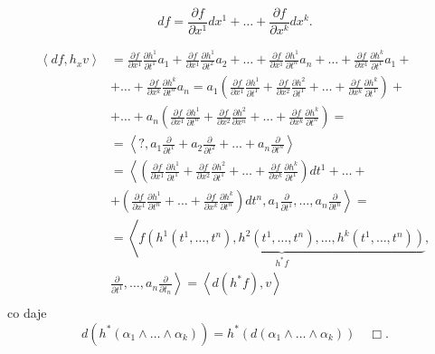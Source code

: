 \documentclass[../main.tex]{subfiles}
\begin{document}
\[
df = \frac{\partial f}{\partial x^1} dx^1 + \ldots + \frac{\partial f}{\partial x^k} dx^k
.\]

\begin{align*}
    \left<df, h_xv \right> &= \frac{\partial f}{\partial x^1} \frac{\partial h^1}{\partial t^1} a_1 + \frac{\partial f}{\partial x^1} \frac{\partial h^1}{\partial t^2} a_2 + \ldots + \frac{\partial f}{\partial x^1} \frac{\partial h^1}{\partial t^n} a_n + \ldots + \frac{\partial f}{\partial x^1} \frac{\partial h^k}{\partial t^1} a_1 + \\
    &+ \ldots + \frac{\partial f}{\partial x^k} \frac{\partial h^k}{\partial t^n} a_n = a_1 \left( \frac{\partial f}{\partial x^1} \frac{\partial h^1}{\partial t^1} + \frac{\partial f}{\partial x^2} \frac{\partial h^2}{\partial t^1} + \ldots + \frac{\partial f}{\partial x^k} \frac{\partial h^k}{\partial t^1} \right) + \\
    &+ \ldots + a_n \left( \frac{\partial f}{\partial x^1} \frac{\partial h^1}{\partial t^n} + \frac{\partial f}{\partial x^2} \frac{\partial h^2}{\partial x^n} + \ldots + \frac{\partial f}{\partial x^k} \frac{\partial h^k}{\partial t^n}  \right) = \\
&= \left< ?, a_1 \frac{\partial }{\partial t^1} + a_2 \frac{\partial }{\partial t^2} + \ldots + a_n \frac{\partial }{\partial t^n}  \right> \\
&= \left< \left( \frac{\partial f}{\partial x^1} \frac{\partial h^1}{\partial t^1} + \frac{\partial f}{\partial x^2} \frac{\partial h^2}{\partial t^1} + \ldots + \frac{\partial f}{\partial x^k} \frac{\partial h^k}{\partial t^1}\right)dt^1 + \ldots + \right.\\
    &\left. + \left( \frac{\partial f}{\partial x^1} \frac{\partial h^1}{\partial t^n} + \ldots + \frac{\partial f}{\partial x^k} \frac{\partial h^k}{\partial t^n}  \right) dt^n , a_1 \frac{\partial }{\partial t^1} , \ldots, a_n \frac{\partial }{\partial t^n}  \right> = \\
&= \left< \underbrace{f\left(h^1(t^1,\ldots, t^n), h^2(t^1,\ldots,t^n), \ldots, h^k(t^1,\ldots,t^n)\right)}_{h^*f} \right.,  \\
&\left. \frac{\partial }{\partial t^1} ,\ldots,a_n \frac{\partial }{\partial t_n}\right> = \left<d\left( h^*f \right) , v \right> \\
\end{align*}
co daje
\[
    d\left( h^*(\alpha_1\land\ldots\land \alpha_k) \right) = h^* \left( d\left( \alpha_1\land\ldots\land \alpha_k \right)  \right) \quad\Box
.\]
\end{document}
